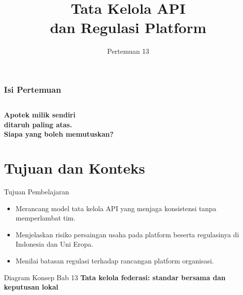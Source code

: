 \documentclass[aspectratio=169, table, 12pt]{beamer}
\title{\Huge Tata Kelola API\\ \vspace{10pt} dan Regulasi Platform}
\date{Pertemuan 13}
\begin{document}
\frame{\titlepage}

\begin{frame}
  \frametitle{Isi Pertemuan}
  \vspace{14pt}
  \begin{columns}[t]
    {\small\tableofcontents[sections={1-6}]}

    {\small\tableofcontents[sections={7-12}]}
  \end{columns}
\end{frame}

\begin{frame}{\hfill}
  \centering
  \Huge{\textbf{Apotek milik sendiri\\ditaruh paling atas.\\Siapa yang boleh memutuskan?}}
\end{frame}

\section{Tujuan dan Konteks}

\begin{frame}{{\Large Tujuan Pembelajaran}}
  \vspace{10pt}
  \begin{itemize}
    \item Merancang model tata kelola API yang menjaga konsistensi tanpa memperlambat tim.
    \item Menjelaskan risiko persaingan usaha pada platform beserta regulasinya di Indonesia dan Uni Eropa.
    \item Menilai batasan regulasi terhadap rancangan platform organisasi.
  \end{itemize}
\end{frame}

\begin{frame}{{\Large Diagram Konsep Bab 13}}
  \centering
  {\small\bfseries Tata kelola federasi: standar bersama dan keputusan lokal}\par\medskip
\end{frame}
\end{document}
